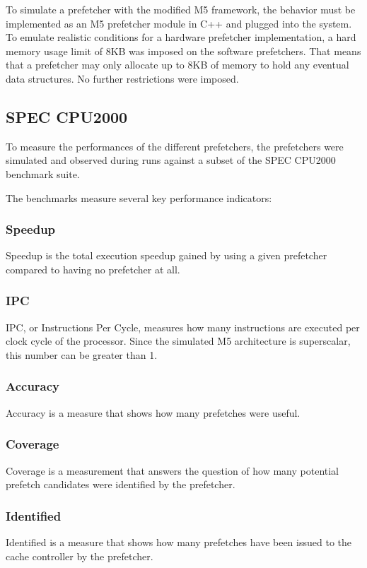 \documentclass[a4paper]{IEEEtran}
\begin{document}
To simulate a prefetcher with the modified M5 framework, the behavior must be implemented as an M5 prefetcher module in C++ and plugged into the system.
To emulate realistic conditions for a hardware prefetcher implementation, a hard memory usage limit of 8KB was imposed on the software prefetchers.
That means that a prefetcher may only allocate up to 8KB of memory to hold any eventual data structures.
No further restrictions were imposed.

\subsection{SPEC CPU2000}

To measure the performances of the different prefetchers, the prefetchers were simulated and observed during runs against a subset of the SPEC CPU2000 benchmark suite.~\cite{http://dl.acm.org/citation.cfm?id=621510}

The benchmarks measure several key performance indicators:

\subsubsection{Speedup}
Speedup is the total execution speedup gained by using a given prefetcher compared to having no prefetcher at all.

\subsubsection{IPC}
IPC, or Instructions Per Cycle, measures how many instructions are executed per clock cycle of the processor.
Since the simulated M5 architecture is superscalar, this number can be greater than 1.

\subsubsection{Accuracy}
Accuracy is a measure that shows how many prefetches were useful.

\subsubsection{Coverage}
Coverage is a measurement that answers the question of how many potential prefetch candidates were identified by the prefetcher.

\subsubsection{Identified}
Identified is a measure that shows how many prefetches have been issued to the cache controller by the prefetcher.
\end{document}
